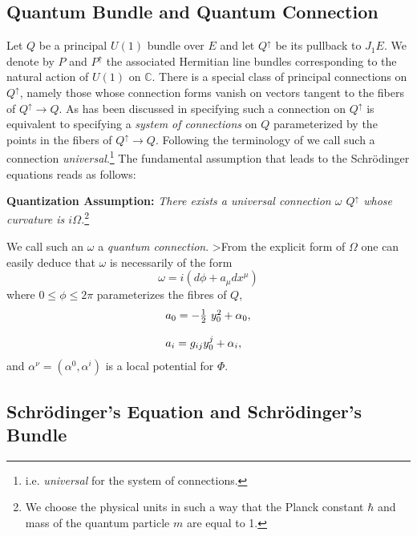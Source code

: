 \documentclass[12pt]{article}
\def\complex{{\mathbb C}}
\begin{document}
\subsection{Quantum Bundle and Quantum Connection}

Let $Q$ be a principal $U (1)$ bundle over $E$
and let $Q^{\uparrow}$ be its pullback to $J_{1}E$. 
We denote by $P$ and $P^{\uparrow}$ the associated Hermitian
line bundles corresponding to the natural action of $U (1)$ on 
$\complex$.  There is a special class of principal connections on
$Q^{\uparrow}$,  namely those whose connection forms vanish on
vectors tangent to the fibers of $Q^{\uparrow} \to
 Q$.  As has
been discussed in \cite{mod}
specifying such a connection on
$Q^{\uparrow}$ is equivalent to specifying a {\em system of
connections} on $Q$ parameterized by the points in the fibers of
$Q^{\uparrow} \to Q$.  Following the terminology of \cite{mod} we
call such a connection {\em universal}.\footnote{i.e.  {\em
universal} for the system of connections.}
The fundamental assumption that leads to the Schr\"{o}dinger
equations  reads as follows:

\medskip
\noindent
{\bf Quantization Assumption: }
{\em There exists a universal connection
$\omega$  $Q^{\uparrow}$ whose curvature is
$i\Omega$.}\footnote{We choose the physical units in such a way
that the Planck constant
$\hbar$ and mass of the quantum particle $m$ are equal to 1. }

We call such an $\omega$ a {\em quantum connection}. 
>From the explicit
form of $\Omega$ one can easily deduce that $\omega$ is
necessarily of the form
$$
\omega = i\left ( d \phi + a_{\mu} dx^{\mu}\right)
$$
where $0\leq \phi \leq 2\pi$ parameterizes the fibres of $Q$, 
$$
\begin{array}{l}
a_{0} = - {1\over 2} \ y^{2}_{0} + \alpha_{0} ,  \cr\cr
a_{i} =  g_{ij} y^{j}_{0} + \alpha_{i} ,  
\end{array}
$$
and $\alpha^{\nu} = \left (\alpha^{0}, \alpha^{i}\right)$ is a local
potential for $\Phi$.
 
\subsection{Schr\"{o}dinger's Equation and Schr\"{o}dinger's Bundle}
\end{document}
